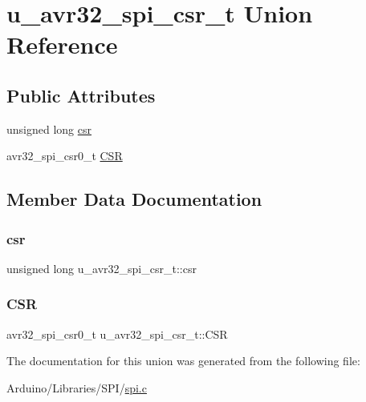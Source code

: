 \hypertarget{unionu__avr32__spi__csr__t}{}\section{u\+\_\+avr32\+\_\+spi\+\_\+csr\+\_\+t Union Reference}
\label{unionu__avr32__spi__csr__t}
\subsection*{Public Attributes}
\begin{DoxyCompactItemize}
\item 
unsigned long \hyperlink{unionu__avr32__spi__csr__t_a119d7f344181184203fc1b94d2058fcf}{csr}
\item 
avr32\+\_\+spi\+\_\+csr0\+\_\+t \hyperlink{unionu__avr32__spi__csr__t_a91cbf745f9d3075ad2c9f1bd628fc687}{C\+SR}
\end{DoxyCompactItemize}


\subsection{Member Data Documentation}
\mbox{\label{unionu__avr32__spi__csr__t_a119d7f344181184203fc1b94d2058fcf}} 
\subsubsection{\texorpdfstring{csr}{csr}}
{\footnotesize\ttfamily unsigned long u\+\_\+avr32\+\_\+spi\+\_\+csr\+\_\+t\+::csr}

\mbox{\label{unionu__avr32__spi__csr__t_a91cbf745f9d3075ad2c9f1bd628fc687}} 
\subsubsection{\texorpdfstring{C\+SR}{CSR}}
{\footnotesize\ttfamily avr32\+\_\+spi\+\_\+csr0\+\_\+t u\+\_\+avr32\+\_\+spi\+\_\+csr\+\_\+t\+::\+C\+SR}



The documentation for this union was generated from the following file\+:\begin{DoxyCompactItemize}
\item 
Arduino/\+Libraries/\+S\+P\+I/\hyperlink{spi_8c}{spi.\+c}\end{DoxyCompactItemize}
